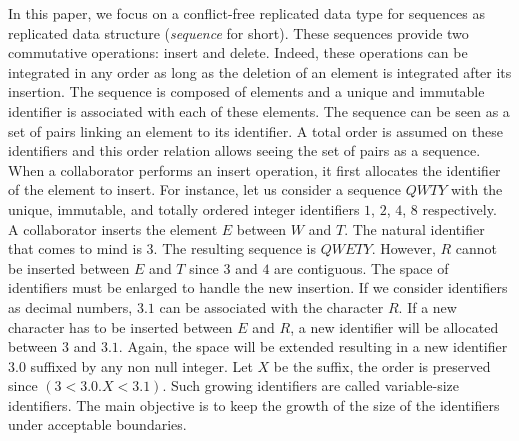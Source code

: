 In this paper, we focus on a conflict-free replicated data type for sequences as
replicated data structure (\emph{sequence} for short). These sequences provide
two commutative operations: insert and delete. Indeed, these operations can be
integrated in any order as long as the deletion of an element is integrated
after its insertion.  The sequence is composed of elements and a unique and
immutable identifier is associated with each of these elements. The sequence can
be seen as a set of pairs linking an element to its identifier. A total order is
assumed on these identifiers and this order relation allows seeing the set of
pairs as a sequence.   When a collaborator performs an insert operation, it first allocates
the identifier of the element to insert. For instance, let us consider a
sequence $QWTY$ with the unique, immutable, and totally ordered integer
identifiers $1$, $2$, $4$, $8$ respectively. A collaborator inserts the element
$E$ between $W$ and $T$. The natural identifier that comes to mind is $3$. The
resulting sequence is $QWETY$. However, $R$ cannot be inserted between $E$ and
$T$ since $3$ and $4$ are contiguous. The space of identifiers must be enlarged
to handle the new insertion. If we consider identifiers as decimal numbers,
$3.1$ can be associated with the character $R$. If a new character has to be
inserted between $E$ and $R$, a new identifier will be allocated between $3$ and
$3.1$. Again, the space will be extended resulting in a new identifier $3.0$
suffixed by any non null integer. Let $X$ be the suffix, the order is preserved
since $(3 < 3.0.X < 3.1)$. Such growing identifiers are called variable-size
identifiers. The main objective is to keep the growth of the size of the
identifiers under acceptable boundaries.



